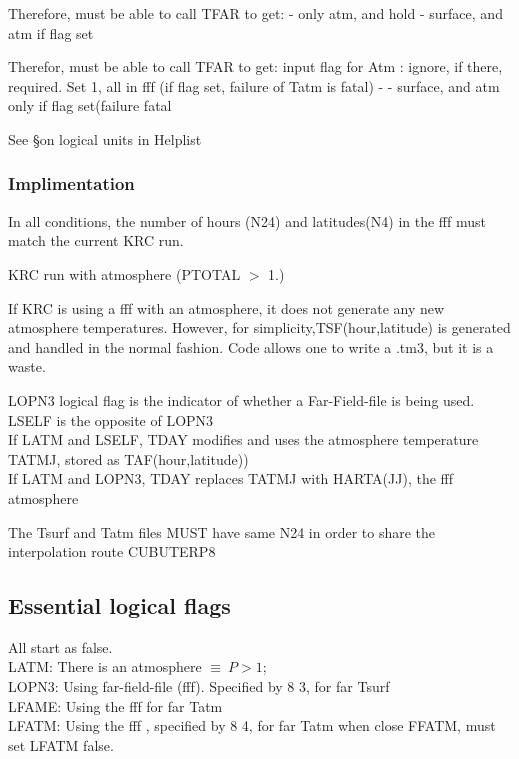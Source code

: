 Therefore, must be able to call TFAR to get:
 \qi - only atm, and hold
\qi - surface, and atm if flag set

Therefor, must be able to call TFAR to get:
input flag for Atm : ignore, if there, required.
 \qi Set 1, all in fff (if flag set, failure of Tatm is fatal)
\qi -
\qi - surface, and atm only if flag set(failure fatal

See \S on logical units in Helplist

\subsubsection{Implimentation}

In all conditions, the number of hours (N24) and latitudes(N4) in the fff must match the current KRC run.

KRC run with atmosphere (PTOTAL $>$ 1.)

 If KRC is using a fff with an atmosphere, it does not generate any new
 atmosphere temperatures. However, for simplicity,TSF(hour,latitude) is
 generated and handled in the normal fashion. Code allows one to write a .tm3,
 but it is a waste.

LOPN3 logical flag is the indicator of whether a Far-Field-file is being used.
\qi LSELF is the opposite of LOPN3
 \\ If  LATM and LSELF, TDAY modifies and uses the atmosphere temperature TATMJ,
 stored as TAF(hour,latitude))
 \\ If  LATM and LOPN3, TDAY replaces TATMJ with HARTA(JJ), the fff atmosphere


 The Tsurf and Tatm files MUST have same N24 in order to share the interpolation route CUBUTERP8

\subsection{Essential logical flags} 
All start as false.
\\ LATM: There is an atmosphere $\equiv \ P>1$; 
\\ LOPN3: Using far-field-file (fff). Specified by 8 3,  for far Tsurf
\\ LFAME: Using the fff   for far Tatm
\\ LFATM: Using the fff  , specified by 8 4, for far Tatm
\qi when close FFATM, must set LFATM false.

